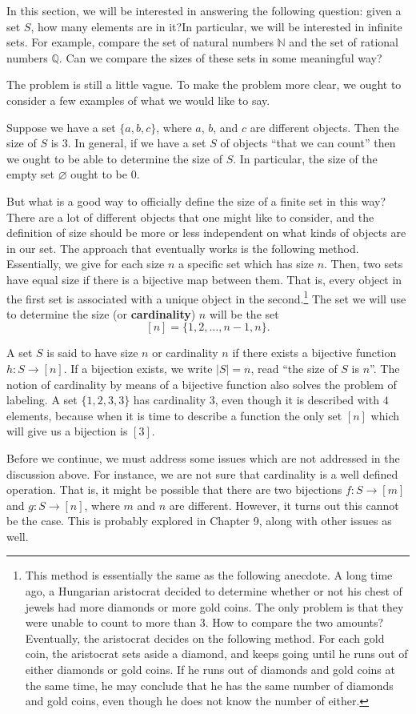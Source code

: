 In this section, we will be interested in answering the following question: given a set $S$, how many elements are in it?In particular, we will be interested in infinite sets. For example, compare the set of natural numbers $\mathbb{N}$ and the set of rational numbers $\mathbb{Q}$. Can we compare the sizes of these sets in some meaningful way?

The problem is still a little vague. To make the problem more clear, we ought to consider a few examples of what we would like to say.

\begin{example}
Suppose we have a set $\{a, b, c\}$, where $a$, $b$, and $c$ are different objects. Then the size of $S$ is $3$. In general, if we have a set $S$ of objects ``that we can count'' then we ought to be able to determine the size of $S$. In particular, the size of the empty set $\varnothing$ ought to be $0$. 
\end{example}

But what is a good way to officially define the size of a finite set in this way? There are a lot of different objects that one might like to consider, and the definition of size should be more or less independent on what kinds of objects are in our set. The approach that eventually works is the following method. Essentially, we give for each size $n$ a specific set which has size $n$. Then, two sets have equal size if there is a bijective map between them. That is, every object in the first set is associated with a unique object in the second.\footnote{This method is essentially the same as the following anecdote. A long time ago, a Hungarian aristocrat decided to determine whether or not his chest of jewels had more diamonds or more gold coins. The only problem is that they were unable to count to more than 3. How to compare the two amounts? Eventually, the aristocrat decides on the following method. For each gold coin, the aristocrat sets aside a diamond, and keeps going until he runs out of either diamonds or gold coins. If he runs out of diamonds and gold coins at the same time, he may conclude that he has the same number of diamonds and gold coins, even though he does not know the number of either.} The set we will use to determine the size (or \textbf{cardinality}) $n$ will be the set
\[[n] = \{1, 2, \dots, n-1, n\}.\]

A set $S$ is said to have size $n$ or cardinality $n$ if there exists a bijective function $h: S \to [n]$. If a bijection exists, we write $|S| = n$, read ``the size of $S$ is $n$''. The notion of cardinality by means of a bijective function also solves the problem of labeling. A set $\{1, 2, 3, 3\}$ has cardinality $3$, even though it is described with $4$ elements, because when it is time to describe a function the only set $[n]$ which will give us a bijection is $[3]$.

Before we continue, we must address some issues which are not addressed in the discussion above. For instance, we are not sure that cardinality is a well defined operation. That is, it might be possible that there are two bijections $f: S \to [m]$ and $g: S \to [n]$, where $m$ and $n$ are different. However, it turns out this cannot be the case. This is probably explored in Chapter 9, along with other issues as well.

